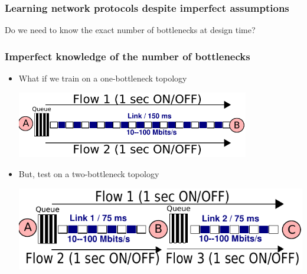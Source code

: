 \begin{frame}
\frametitle{Learning network protocols despite imperfect assumptions}
\begin{centering}
Do we need to know the exact number of bottlenecks at design time?
\end{centering}
\end{frame}

\begin{frame}
\frametitle{Imperfect knowledge of the number of bottlenecks}
\large
\begin{centering}

\begin{itemize}
\item<2-> What if we train on a one-bottleneck topology\\
\begin{centering}
\includegraphics[width=0.8\textwidth]{onelink.pdf}
\end{centering}
\item<3-> But, test on a two-bottleneck topology\\
\begin{centering}
\includegraphics[width=0.8 \textwidth]{twolink.pdf}
\end{centering}
\end{itemize}
\end{centering}
\end{frame}

